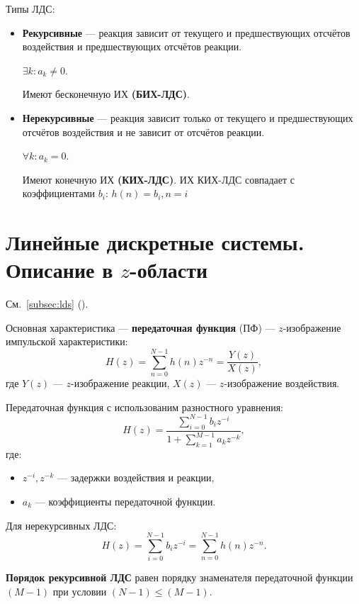 \documentclass[a4paper, 14pt]{extarticle}
\begin{document}
Типы ЛДС:
\begin{itemize}
    \item \textbf{Рекурсивные} --- реакция зависит от текущего и предшествующих отсчётов воздействия и предшествующих отсчётов реакции.
        
        $ \exists k: a_k \ne 0$.

        Имеют бесконечную ИХ \textbf{(БИХ-ЛДС)}.
    \item \textbf{Нерекурсивные} --- реакция зависит только от текущего и предшествующих отсчётов воздействия и не зависит от отсчётов реакции.

        $\forall k: a_k = 0$.

        Имеют конечную ИХ \textbf{(КИХ-ЛДС)}. ИХ КИХ-ЛДС совпадает с коэффициентами $b_i$: $h(n) = b_i, n=i$
\end{itemize}

\section{Линейные дискретные системы. Описание в $z$-области}
См.~\ref{subsec:lds} ().

Основная характеристика --- \textbf{передаточная функция} (ПФ) --- $z$-изображение импульской характеристики:
\begin{equation}\label{eq:tf}
    H(z) = \sum^{N-1}_{n=0} h(n) z^{-n} = \frac{Y(z)}{X(z)},
\end{equation}
где $Y(z)$ --- $z$-изображение реакции, $X(z)$ --- $z$-изображение воздействия.

Передаточная функция с использованим разностного уравнения:
\begin{equation}
    H(z) = \frac{ \sum^{N-1}_{i=0} b_i z^{-i} }{1 + \sum^{M-1}_{k=1} a_k z^{-k}},
\end{equation}
где:
\begin{itemize}
    \item $z^{-i}, z^{-k}$ --- задержки воздействия и реакции,
    \item $a_k$ --- коэффициенты передаточной функции.
\end{itemize}

Для нерекурсивных ЛДС:
\begin{equation}
    H(z) = \sum^{N-1}_{i=0} b_i z^{-i} = \sum^{N-1}_{n=0} h(n) z^{-n}.
\end{equation}

\textbf{Порядок рекурсивной ЛДС} равен порядку знаменателя передаточной функции $(M-1)$ при условии $(N-1) \le (M-1)$.
\end{document}
